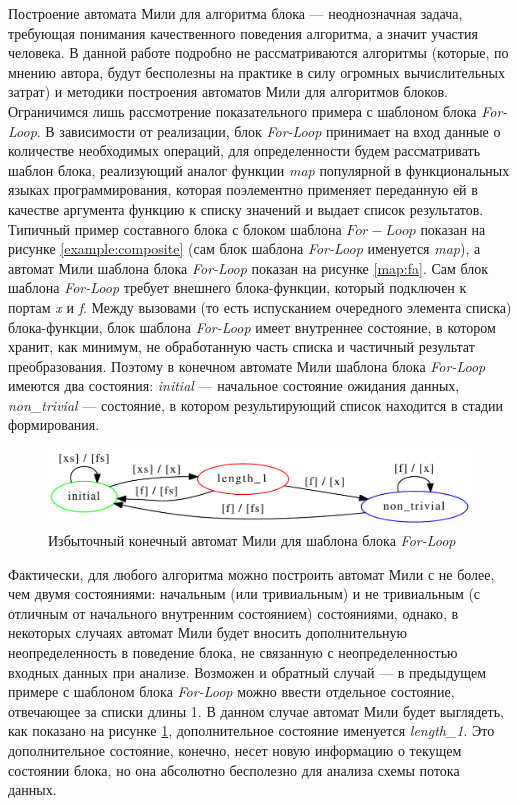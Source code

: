 \documentclass[10pt,a4paper]{article}
\begin{document}
Построение автомата Мили для алгоритма блока --- неоднозначная задача, требующая понимания качественного поведения алгоритма, а значит участия человека. В данной работе подробно не рассматриваются алгоритмы (которые, по мнению автора, будут бесполезны на практике в силу огромных вычислительных затрат) и методики построения автоматов Мили для алгоритмов блоков. Ограничимся лишь рассмотрение показательного примера с шаблоном блока \textit{For-Loop}. В зависимости от реализации, блок \textit{For-Loop} принимает на вход данные о количестве необходимых операций, для определенности будем рассматривать шаблон блока, реализующий аналог функции \textit{map} популярной в функциональных языках программирования,
которая поэлементно применяет переданную ей в качестве аргумента функцию к списку значений и выдает список результатов. Типичный пример составного блока с блоком шаблона $For-Loop$ показан на рисунке \ref{example:composite} (сам блок шаблона \textit{For-Loop} именуется \textit{map}), а автомат Мили шаблона блока \textit{For-Loop}
показан на рисунке \ref{map:fa}. Сам блок шаблона \textit{For-Loop} требует внешнего блока-функции, который подключен к портам \textit{x} и \textit{f}.
Между вызовами (то есть испусканием очередного элемента списка) блока-функции, блок шаблона \textit{For-Loop} имеет внутреннее состояние, в котором хранит, как минимум,
не обработанную часть списка и частичный результат преобразования. Поэтому в конечном автомате Мили шаблона блока \textit{For-Loop} имеются два состояния:
\textit{initial} --- начальное состояние ожидания данных, \textit{non\_trivial} --- состояние, в котором результирующий список находится в стадии формирования.

\begin{figure}
    \centering
    \includegraphics[width=\textwidth]{map_extra_fa.pdf}
    \caption{Избыточный конечный автомат Мили для шаблона блока \textit{For-Loop}}
    \label{map:extra_fa}
\end{figure}

Фактически, для любого алгоритма можно построить автомат Мили с не более, чем двумя состояниями: начальным (или тривиальным) и не тривиальным (с отличным от начального внутренним
состоянием) состояниями, однако, в некоторых случаях автомат Мили будет вносить дополнительную неопределенность в поведение блока, не связанную с неопределенностью
входных данных при анализе. Возможен и обратный случай --- в предыдущем примере с шаблоном блока \textit{For-Loop} можно ввести отдельное состояние, отвечающее за списки длины 1.
В данном случае автомат Мили будет выглядеть, как показано на рисунке \ref{map:extra_fa}, дополнительное состояние именуется \textit{length\_1}. Это дополнительное состояние, конечно,
несет новую информацию о текущем состоянии блока, но она абсолютно бесполезно для анализа схемы потока данных.
\end{document}
